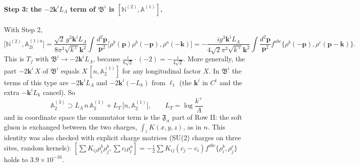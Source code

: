 \documentclass[10pt]{article}
\numberwithin{equation}{section}
\newcommand{\bk}{\mathbf k}
\newcommand{\bp}{\mathbf p}
\begin{document}
\paragraph{Step 3: the $-2\bk^iL_\Lambda$ term of $\mathfrak B^i$ is $[\mathbb N^{(2)},\mathbb A^{(1)}]$.} With Step 2,
\begin{equation}
\big[\mathbb N^{(2)},\mathbb A^{(1)a}_{2i}\big]=\frac{\sqrt2\,g^3\bk^iL_\Lambda}{8\pi^3\sqrt{k^+}\bk^2}\int\frac{d^2\bp}{\bp^2}\big[\rho^b(\bp)\rho^b(-\bp),\rho^a(-\bk)\big]
=-\frac{ig^3\bk^iL_\Lambda}{4\sqrt2\pi^3\sqrt{k^+}\bk^2}\int\frac{d^2\bp}{\bp^2}f^{abc}\{\rho^b(-\bp),\rho^c(\bp-\bk)\}.
\end{equation}
This is $T_f$ with $\mathfrak B^i\to-2\bk^iL_\Lambda$, because $\frac{i}{8\sqrt2}\cdot(-2)=-\frac{i}{4\sqrt2}$. More generally, the part $-2\bk^i\,X$ of $\mathfrak B^i$ equals $X\,[n,\mathbb A^{(1)}_2]$ for any longitudinal factor $X$. In $\mathfrak B^i$ the terms of this type are $-2\bk^iL_\Lambda$ and $-2\bk^i(-L_k)$ from $\ell_1$ (the $\bk^i$ in $C^i$ and the extra $-\bk^iL_k$ cancel). So
\begin{equation}
\boxed{\;\mathbb A^{(3)}_2\supset L_\Lambda\,n\,\mathbb A^{(1)}_2+L_T\,\big[n,\mathbb A^{(1)}_2\big],\qquad L_T=\log\frac{k^+}{\Lambda}\;}
\label{eq:Awritten}
\end{equation}
and in coordinate space the commutator term is the $\mathfrak F_\alpha$ part of Row II: the soft gluon is exchanged between the two charges, $\int_zK(x,y,z)$, as in $n$. This identity was also checked with explicit charge matrices (SU(2) charges on three sites, random kernels): $[\sum K_{ij}\rho^b_i\rho^b_j,\sum c_l\rho^a_l]=-\frac i2\sum K_{ij}(c_j-c_i)f^{abc}\{\rho^b_i,\rho^c_j\}$ holds to $3.9\times10^{-16}$.
\end{document}
